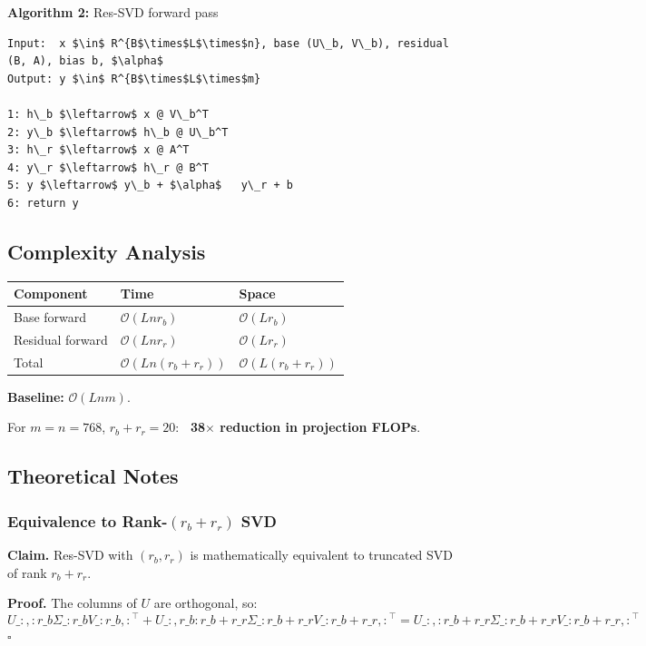 \textbf{Algorithm 2:} Res-SVD forward pass
\begin{lstlisting}
Input:  x $\in$ R^{B$\times$L$\times$n}, base (U\_b, V\_b), residual (B, A), bias b, $\alpha$
Output: y $\in$ R^{B$\times$L$\times$m}

1: h\_b $\leftarrow$ x @ V\_b^T
2: y\_b $\leftarrow$ h\_b @ U\_b^T
3: h\_r $\leftarrow$ x @ A^T
4: y\_r $\leftarrow$ h\_r @ B^T
5: y $\leftarrow$ y\_b + $\alpha$   y\_r + b
6: return y
\end{lstlisting}

\subsection{Complexity Analysis}

\begin{table}[H]
\centering
\small
\begin{tabular}{lll}
\toprule
\textbf{Component} & \textbf{Time} & \textbf{Space} \\
\midrule
Base forward & $\mathcal{O}(L n r_b)$ & $\mathcal{O}(L r_b)$ \\
Residual forward & $\mathcal{O}(L n r_r)$ & $\mathcal{O}(L r_r)$ \\
Total & $\mathcal{O}(L n (r_b + r_r))$ & $\mathcal{O}(L (r_b + r_r))$ \\
\bottomrule
\end{tabular}
\end{table}

\textbf{Baseline:} $\mathcal{O}(L n m)$.

For $m = n = 768$, $r_b + r_r = 20$: \textbf{~38$\times$ reduction in projection FLOPs}.

\subsection{Theoretical Notes}

\subsubsection{Equivalence to Rank-$(r_b + r_r)$ SVD}

\textbf{Claim.} Res-SVD with $(r_b, r_r)$ is mathematically equivalent to 
truncated SVD of rank $r_b + r_r$.

\textbf{Proof.} The columns of $U$ are orthogonal, so:
\[
U\_{:, :r\_b} \Sigma\_{:r\_b} V\_{:r\_b, :}^\top + U\_{:, r\_b:r\_b+r\_r} \Sigma\_{:r\_b+r\_r} V\_{:r\_b+r\_r, :}^\top = U\_{:, :r\_b+r\_r} \Sigma\_{:r\_b+r\_r} V\_{:r\_b+r\_r, :}^\top
\]
$\square$

